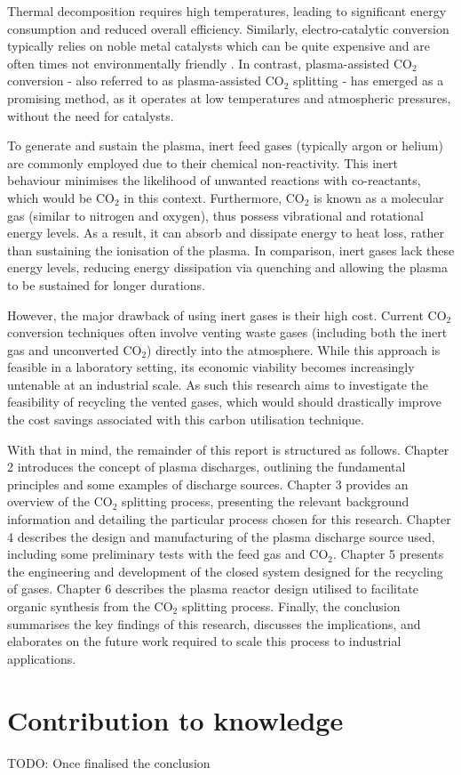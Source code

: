 Thermal decomposition requires high temperatures, leading to significant energy consumption and reduced overall efficiency. Similarly, electro-catalytic conversion typically relies on noble metal catalysts which can be quite expensive and are often times not environmentally friendly \cite{Khunda2023}. In contrast, plasma-assisted CO$_2$ conversion - also referred to as plasma-assisted CO$_2$ splitting - has emerged as a promising method, as it operates at low temperatures and atmospheric pressures, without the need for catalysts. 

To generate and sustain the plasma, inert feed gases (typically argon or helium) are commonly employed due to their chemical non-reactivity. This inert behaviour minimises the likelihood of unwanted  reactions with co-reactants, which would be CO$_2$ in this context. Furthermore, CO$_2$ is known as a molecular gas (similar to nitrogen and oxygen), thus possess vibrational and rotational energy levels. As a result, it can absorb and dissipate energy to heat loss, rather than sustaining the ionisation of the plasma. In comparison, inert gases lack these energy levels, reducing energy dissipation via quenching and allowing the plasma to be sustained for longer durations.

However, the major drawback of using inert gases is their high cost. Current CO$_2$ conversion techniques often involve venting waste gases (including both the inert gas and unconverted CO$_2$) directly into the atmosphere. While this approach is feasible in a laboratory setting, its economic viability becomes increasingly untenable at an industrial scale. As such this research aims to investigate the feasibility of recycling the vented gases, which would should drastically improve the cost savings associated with this carbon utilisation technique. 

With that in mind, the remainder of this report is structured as follows. Chapter 2 introduces the concept of plasma discharges, outlining the fundamental principles and some examples of discharge sources. Chapter 3 provides an overview of the CO$_2$ splitting process, presenting the relevant background information and detailing the particular process chosen for this research. Chapter 4 describes the design and manufacturing of the plasma discharge source used, including some preliminary tests with the feed gas and CO$_2$. Chapter 5 presents the engineering and development of the closed system designed for the recycling of gases. Chapter 6 describes the plasma reactor design utilised to facilitate organic synthesis from the CO$_2$ splitting process. Finally, the conclusion summarises the key findings of this research, discusses the implications, and elaborates on the future work required to scale this process to industrial applications. 



\section{Contribution to knowledge}

TODO: Once finalised the conclusion